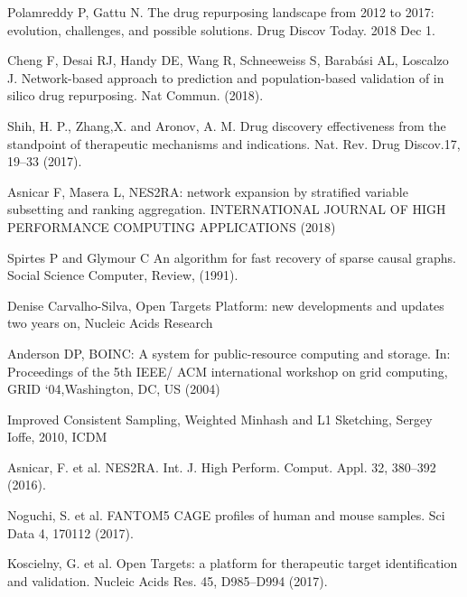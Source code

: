 \documentclass[fleqn,10pt]{SelfArx} %
\begin{document}

%
\begin{thebibliography}{1}
	
	 Polamreddy P, Gattu N. The drug repurposing landscape from 2012 to 2017: evolution, challenges, and possible solutions. Drug Discov Today. 2018 Dec 1.	
	
	 Cheng F, Desai RJ, Handy DE, Wang R, Schneeweiss S, Barabási AL, Loscalzo J. Network-based approach to prediction and population-based validation of in silico drug repurposing. Nat Commun. (2018).
	
	 Shih, H. P., Zhang,X. and Aronov, A. M. Drug discovery effectiveness from the standpoint of therapeutic mechanisms and indications. Nat. Rev. Drug Discov.17, 19–33 (2017).

	 Asnicar F, Masera L, NES2RA: network expansion by stratified variable subsetting and ranking aggregation. INTERNATIONAL JOURNAL OF HIGH PERFORMANCE COMPUTING APPLICATIONS (2018)
	
	Spirtes P and Glymour C An algorithm for fast recovery
of sparse causal graphs. Social Science Computer, Review, (1991).  

	Denise Carvalho-Silva, Open Targets Platform: new developments and updates two years on, Nucleic Acids Research 
	
	Anderson DP, BOINC: A system for public-resource computing and storage. In: Proceedings of the 5th IEEE/ ACM international workshop on grid computing, GRID ‘04,Washington, DC, US (2004)
	
	Improved Consistent Sampling, Weighted Minhash and L1 Sketching, Sergey Ioffe, 2010, ICDM
	
	 Asnicar, F. et al. NES2RA. Int. J. High Perform. Comput. Appl. 32, 380–392 (2016).
	
	
	 Noguchi, S. et al. FANTOM5 CAGE profiles of human and mouse samples. Sci Data 4, 170112 (2017).
	
	
	 Koscielny, G. et al. Open Targets: a platform for therapeutic target identification and validation. Nucleic Acids Res. 45, D985–D994 (2017).
	
	
\end{thebibliography}
\end{document}
